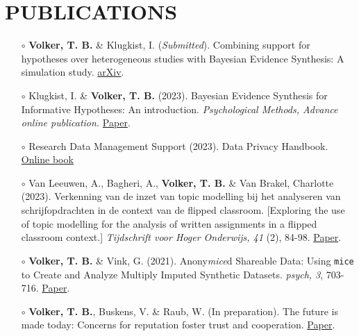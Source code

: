\documentclass[11pt,a4paper,roman,colorlinks,linkcolor = blue]{moderncv}        %
\begin{document}

\section{PUBLICATIONS}

\begin{itemize}

\item[$\circ$]\textbf{Volker, T. B.} \& Klugkist, I. (\textit{Submitted}). Combining support for hypotheses over heterogeneous studies with Bayesian Evidence Synthesis: A simulation study. \href{https://arxiv.org/pdf/2312.15032.pdf}{arXiv}.

\item[$\circ$] Klugkist, I. \& \textbf{Volker, T. B.} (2023). Bayesian Evidence Synthesis for Informative Hypotheses: An introduction. \textit{Psychological Methods, Advance online publication.} \href{https://psycnet.apa.org/fulltext/2024-05522-001.html}{Paper}.

\item[$\circ$] Research Data Management Support (2023). Data Privacy Handbook. \href{https://utrechtuniversity.github.io/dataprivacyhandbook/}{Online book}

\item[$\circ$] Van Leeuwen, A., Bagheri, A., \textbf{Volker, T. B.} \& Van Brakel, Charlotte (2023). Verkenning van de inzet van topic modelling bij het analyseren van schrijfopdrachten in de context van de flipped classroom. [Exploring the use of topic modelling for the analysis of written assignments in a flipped classroom context.] \textit{Tijdschrift voor Hoger Onderwijs, 41} (2), 84-98. \href{https://tvho.nl/article/download/15690/17434}{Paper}.

\item[$\circ$] \textbf{Volker, T. B.} \& Vink, G. (2021). Anony\textit{mice}d Shareable Data: Using \texttt{mice} to Create and Analyze Multiply Imputed Synthetic Datasets. \textit{psych, 3}, 703-716. \href{https://www.mdpi.com/2624-8611/3/4/45}{Paper}.

\item[$\circ$] \textbf{Volker, T. B.}, Buskens, V. \& Raub, W. (In preparation). The future is made today: Concerns for reputation foster trust and cooperation. \href{https://github.com/thomvolker/bes_master_thesis_sasr/blob/main/thesis/thesis_volker.pdf}{Paper}.
\end{itemize}
\end{document}
